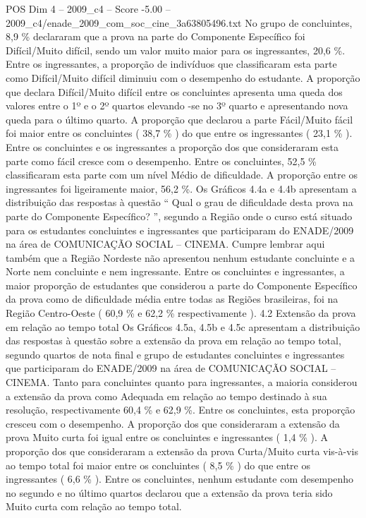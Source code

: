 \begin{textsample}{POS Dim 4 – 2009\_c4 – Score -5.00 – 2009\_c4/enade\_2009\_com\_soc\_cine\_3a63805496.txt}
No grupo de concluintes, 8,9 \% declararam que a prova na parte do Componente Específico foi Difícil/Muito difícil, sendo um valor muito maior para os ingressantes, 20,6 \%.
Entre os ingressantes, a proporção de indivíduos que classificaram esta parte como Difícil/Muito difícil diminuiu com o desempenho do estudante.
A proporção que declara Difícil/Muito difícil entre os concluintes apresenta uma queda dos valores entre o 1º e o 2º quartos elevando -se no 3º quarto e apresentando nova queda para o último quarto.
A proporção que declarou a parte Fácil/Muito fácil foi maior entre os concluintes ( 38,7 \% ) do que entre os ingressantes ( 23,1 \% ).
Entre os concluintes e os ingressantes a proporção dos que consideraram esta parte como fácil cresce com o desempenho.
Entre os concluintes, 52,5 \% classificaram esta parte com um nível Médio de dificuldade.
A proporção entre os ingressantes foi ligeiramente maior, 56,2 \%.
Os Gráficos 4.4a e 4.4b apresentam a distribuição das respostas à questão “ Qual o grau de dificuldade desta prova na parte do Componente Específico? ”, segundo a Região onde o curso está situado para os estudantes concluintes e ingressantes que participaram do ENADE/2009 na área de COMUNICAÇÃO SOCIAL – CINEMA.
Cumpre lembrar aqui também que a Região Nordeste não apresentou nenhum estudante concluinte e a Norte nem concluinte e nem ingressante.
Entre os concluintes e ingressantes, a maior proporção de estudantes que considerou a parte do Componente Específico da prova como de dificuldade média entre todas as Regiões brasileiras, foi na Região Centro-Oeste ( 60,9 \% e 62,2 \% respectivamente ). 4.2 Extensão da prova em relação ao tempo total Os Gráficos 4.5a, 4.5b e 4.5c apresentam a distribuição das respostas à questão sobre a extensão da prova em relação ao tempo total, segundo quartos de nota final e grupo de estudantes concluintes e ingressantes que participaram do ENADE/2009 na área de COMUNICAÇÃO SOCIAL – CINEMA.
Tanto para concluintes quanto para ingressantes, a maioria considerou a extensão da prova como Adequada em relação ao tempo destinado à sua resolução, respectivamente 60,4 \% e 62,9 \%.
Entre os concluintes, esta proporção cresceu com o desempenho.
A proporção dos que consideraram a extensão da prova Muito curta foi igual entre os concluintes e ingressantes ( 1,4 \% ).
A proporção dos que consideraram a extensão da prova Curta/Muito curta vis-à-vis ao tempo total foi maior entre os concluintes ( 8,5 \% ) do que entre os ingressantes ( 6,6 \% ).
Entre os concluintes, nenhum estudante com desempenho no segundo e no último quartos declarou que a extensão da prova teria sido Muito curta com relação ao tempo total.

\end{textsample}
